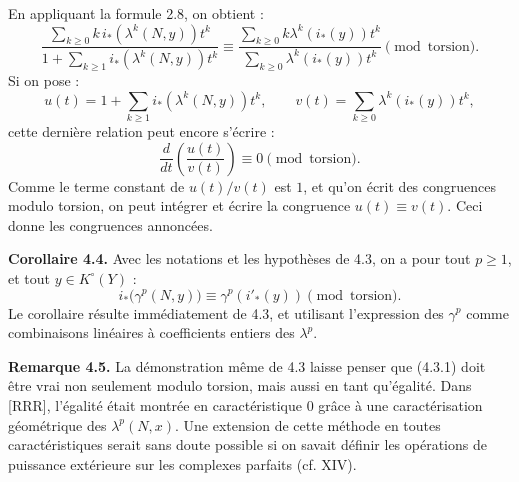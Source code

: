 En
appliquant la formule 2.8, on obtient :
\[
  \frac{\sum_{k\ge0}k\,i_*(\lambda^k(N,y))t^k}
       {1+\sum_{k\ge1} i_*(\lambda^k(N,y))t^k}
  \equiv
  \frac{\sum_{k\ge0}k\lambda^k(i_*(y))t^k}
       {\sum_{k\ge0}\lambda^k(i_*(y))t^k}
       \pmod{\text{torsion}}.
\]
Si on pose :
\[
  u(t)=1+\sum_{k\ge1}i_*(\lambda^k(N,y))t^k,\qquad
  v(t)=\sum_{k\ge0}\lambda^k(i_*(y))t^k,
\]
cette dernière relation peut encore s'écrire :
\[
  \frac{d}{dt}\!\left(\frac{u(t)}{v(t)}\right)\equiv0
  \pmod{\text{torsion}}.
\]
Comme le terme constant de \(u(t)/v(t)\) est \(1\), et qu'on écrit des congruences modulo torsion, on peut intégrer et écrire la congruence \(u(t)\equiv v(t)\). Ceci donne les congruences annoncées.

\textbf{Corollaire 4.4.} Avec les notations et les hypothèses de 4.3, on a pour tout \(p\ge1\), et tout \(y\in K^\circ(Y)\) :
\[
  i_*\bigl(\gamma^p(N,y)\bigr)\equiv \gamma^p(i'_*(y))
  \pmod{\text{torsion}}.
\]
Le corollaire résulte immédiatement de 4.3, et utilisant l'expression des \(\gamma^p\) comme combinaisons linéaires à coefficients entiers des \(\lambda^p\).

\textbf{Remarque 4.5.} La démonstration même de 4.3 laisse penser que (4.3.1) doit être vrai non seulement modulo torsion, mais aussi en tant qu'égalité. Dans [RRR], l'égalité était montrée en caractéristique \(0\) grâce à une caractérisation géométrique des \(\lambda^p(N,x)\). Une extension de cette méthode en toutes caractéristiques serait sans doute possible si on savait définir les opérations de puissance extérieure sur les complexes parfaits (cf. XIV).

